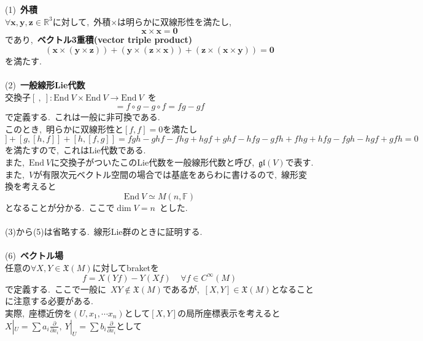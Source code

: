 \documentclass[uplatex,dvipdfmx]{jsarticle}
\begin{document}
\begin{myproof}
(1)~\textbf{外積}\\
$\forall\bm{x},\bm{y},\bm{z}\in \mathbb{R}^3$に対して,~外積$\times$は明らかに双線形性を満たし,~
\begin{equation*}
    \bm{x}\times\bm{x}=\bm{0}
\end{equation*}
であり,~\textbf{ベクトル3重積(vector triple product)}
\begin{equation*}
    (\bm{x}\times(\bm{y}\times \bm{z}))+(\bm{y}\times(\bm{z}\times \bm{x}))+(\bm{z}\times(\bm{x}\times \bm{y}))=\bm{0}
\end{equation*}
を満たす.\\\\
(2)~\textbf{一般線形Lie代数}\\
交換子$[~,~]:\text{End}~V\times \text{End}~V\to \text{End}~V$~を
\begin{equation*}
    [f,g]=f\circ g-g\circ f = fg-gf
\end{equation*}
で定義する.~これは一般に非可換である.\\
このとき,~明らかに双線形性と$[f,f]=0$を満たし
\begin{equation*}
    [f,[g,h]]+[g,[h,f]]+[h,[f,g]]=fgh-ghf-fhg+hgf+ghf-hfg-gfh+fhg+hfg-fgh-hgf+gfh=0
\end{equation*}
を満たすので,~これはLie代数である.\\
また,~$\text{End}~V$に交換子がついたこのLie代数を一般線形代数と呼び,~$\mathfrak{gl}(V)$で表す.\\
また,~$V$が有限次元ベクトル空間の場合では基底をあらわに書けるので,~線形変換を考えると
\begin{equation*}
    \text{End}~V \simeq M(n,\mathbb{F})
\end{equation*}
となることが分かる.~ここで$\dim V=n$~とした.\\\\
(3)から(5)は省略する.~線形Lie群のときに証明する.\\\\
(6)~\textbf{ベクトル場}\\
任意の$\forall X,Y\in \mathfrak{X}(M)$に対してbraketを
\begin{equation*}
    [X,Y]f = X(Yf)-Y(Xf)~~~~~\forall f\in C^\infty(M)
\end{equation*}
で定義する.~ここで一般に~$XY\notin \mathfrak{X}(M)$であるが,~$[X,Y]\in \mathfrak{X}(M)$となることに注意する必要がある.\\
実際,~座標近傍を$(U,x_1,\cdots x_n)$として$[X,Y]$の局所座標表示を考えると$X|_U = \sum a_i\frac{\partial}{\partial x_i},~Y|_U = \sum b_i\frac{\partial}{\partial x_i}$として

\end{myproof}
\end{document}
